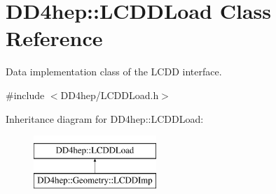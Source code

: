 \hypertarget{class_d_d4hep_1_1_l_c_d_d_load}{}\section{D\+D4hep\+:\+:L\+C\+D\+D\+Load Class Reference}
\label{class_d_d4hep_1_1_l_c_d_d_load}


Data implementation class of the L\+C\+DD interface.  




{\ttfamily \#include $<$D\+D4hep/\+L\+C\+D\+D\+Load.\+h$>$}

Inheritance diagram for D\+D4hep\+:\+:L\+C\+D\+D\+Load\+:\begin{figure}[H]
\begin{center}
\leavevmode
\includegraphics[height=2.000000cm]{class_d_d4hep_1_1_l_c_d_d_load}
\end{center}
\end{figure}
